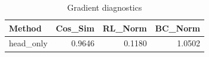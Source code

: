 \begin{table}[htbp]
\centering
\caption{Gradient diagnostics}
\label{tab:grad-diag}
\begin{tabular}{lrrr}
\toprule
\textbf{Method} & \textbf{Cos\_Sim} & \textbf{RL\_Norm} & \textbf{BC\_Norm} \\
\midrule
head\_only & 0.9646 & 0.1180 & 1.0502 \\
\bottomrule
\end{tabular}
\end{table}